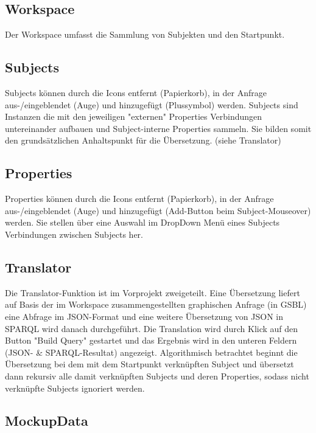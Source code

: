 \subsection{Workspace}

Der Workspace umfasst die Sammlung von Subjekten und den Startpunkt.

\subsection{Subjects}

Subjects können durch die Icons entfernt (Papierkorb), in der Anfrage aus-/eingeblendet (Auge) und hinzugefügt (Plussymbol) werden.
Subjects sind Instanzen die mit den jeweiligen "externen" Properties Verbindungen untereinander aufbauen und Subject-interne Properties sammeln. Sie bilden somit den grundsätzlichen
Anhaltspunkt für die Übersetzung. (siehe Translator)

\subsection{Properties}

Properties können durch die Icons entfernt (Papierkorb), in der Anfrage aus-/eingeblendet (Auge) und hinzugefügt (Add-Button beim Subject-Mouseover) werden.
Sie stellen über eine Auswahl im DropDown Menü eines Subjects Verbindungen zwischen Subjects her.

\subsection{Translator}

Die Translator-Funktion ist im Vorprojekt zweigeteilt. Eine Übersetzung liefert auf Basis der im Workspace zusammengestellten graphischen Anfrage (in GSBL) eine Abfrage im
JSON-Format und eine weitere Übersetzung von JSON in SPARQL wird danach durchgeführt.
Die Translation wird durch Klick auf den Button "Build Query" gestartet und das Ergebnis wird in den unteren Feldern (JSON- \& SPARQL-Resultat) angezeigt.
Algorithmisch betrachtet beginnt die Übersetzung bei dem mit dem Startpunkt verknüpften Subject und übersetzt dann rekursiv alle damit verknüpften Subjects und deren Properties, sodass nicht verknüpfte Subjects ignoriert werden. 

\subsection{MockupData}


